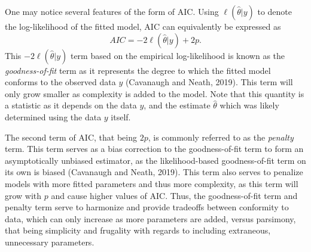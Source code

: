 		One may notice several features of the form of AIC. Using $\ell(\hat{\theta}|y)$ to denote the log-likelihood of the fitted model, AIC can equivalently be expressed as
		\begin{equation}
			AIC = -2 \ell(\hat{\theta}|y) + 2 p.
		\end{equation}
		This $-2 \ell(\hat{\theta}|y)$ term based on the empirical log-likelihood is known as the \textit{goodness-of-fit} term as it represents the degree to which the fitted model
		conforms to the observed data $y$ (Cavanaugh and Neath, 2019). This term will only grow smaller as complexity is added to the model. Note that this quantity is
		a statistic as it depends on the data $y$, and the estimate $\hat{\theta}$ which was likely determined using the data $y$ itself.

		The second term of AIC, that being $2 p$, is commonly referred to as the \textit{penalty} term. This term serves as a bias correction to the goodness-of-fit term to form an asymptotically
		unbiased estimator, as the likelihood-based goodness-of-fit term on its own is biased (Cavanaugh and Neath, 2019). This term also serves to penalize models with more fitted parameters and
		thus more complexity, as this term will grow with $p$ and cause higher values of AIC. Thus, the goodness-of-fit term and penalty term serve to harmonize and provide tradeoffs between
		conformity to data, which can only increase as more parameters are added, versus parsimony, that being simplicity and frugality with regards to including extraneous, unnecessary
		parameters.

